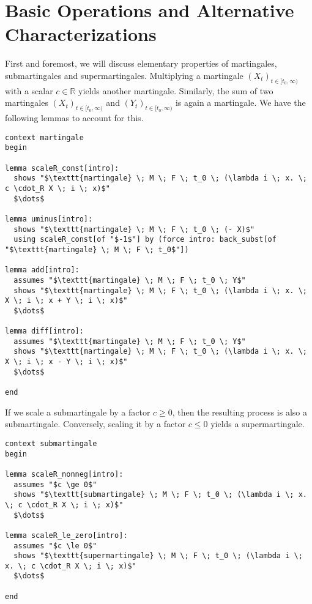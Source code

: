 \section{Basic Operations and Alternative Characterizations}

First and foremost, we will discuss elementary properties of martingales, submartingales and supermartingales. Multiplying a martingale $(X_t)_{t \in [t_0,\infty)}$ with a scalar $c \in \mathbb{R}$ yields another martingale. Similarly, the sum of two martingales $(X_t)_{t \in [t_0,\infty)}$ and $(Y_t)_{t \in [t_0,\infty)}$ is again a martingale. We have the following lemmas to account for this.

\begin{isalemma}
{\small
\begin{lstlisting}[style=isabelle]
context martingale
begin

lemma scaleR_const[intro]:
  shows "$\texttt{martingale} \; M \; F \; t_0 \; (\lambda i \; x. \; c \cdot_R X \; i \; x)$"
  $\dots$

lemma uminus[intro]:
  shows "$\texttt{martingale} \; M \; F \; t_0 \; (- X)$" 
  using scaleR_const[of "$-1$"] by (force intro: back_subst[of "$\texttt{martingale} \; M \; F \; t_0$"])

lemma add[intro]:
  assumes "$\texttt{martingale} \; M \; F \; t_0 \; Y$"
  shows "$\texttt{martingale} \; M \; F \; t_0 \; (\lambda i \; x. \; X \; i \; x + Y \; i \; x)$"
  $\dots$

lemma diff[intro]:
  assumes "$\texttt{martingale} \; M \; F \; t_0 \; Y$"
  shows "$\texttt{martingale} \; M \; F \; t_0 \; (\lambda i \; x. \; X \; i \; x - Y \; i \; x)$"
  $\dots$
  
end
\end{lstlisting}
}
\end{isalemma}

If we scale a submartingale by a factor $c \ge 0$, then the resulting process is also a submartingale. Conversely, scaling it by a factor $c \le 0$ yields a supermartingale. 

\begin{isalemma}
{\small
\begin{lstlisting}[style=isabelle]
context submartingale
begin

lemma scaleR_nonneg[intro]:
  assumes "$c \ge 0$"
  shows "$\texttt{submartingale} \; M \; F \; t_0 \; (\lambda i \; x. \; c \cdot_R X \; i \; x)$"
  $\dots$

lemma scaleR_le_zero[intro]:
  assumes "$c \le 0$"
  shows "$\texttt{supermartingale} \; M \; F \; t_0 \; (\lambda i \; x. \; c \cdot_R X \; i \; x)$"
  $\dots$

end
\end{lstlisting}
}
\end{isalemma}

